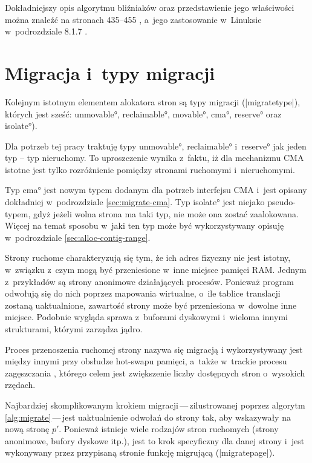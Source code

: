 Dokładniejszy opis algorytmu bliźniaków oraz przedstawienie jego
właściwości można znaleźć na stronach 435--455
\autocite{bib:taocp-fa}, a~jego zastosowanie w~Linuksie w~podrozdziale
8.1.7 \autocite{bib:utlk}.


\section{Migracja i~typy migracji}\label{sec:migratetype}

Kolejnym istotnym elementem alokatora stron są typy migracji
(\code|migratetype|), których jest sześć: \ang*{unmovable},
\ang*{reclaimable}, \ang*{movable}, \ang*{cma}, \ang*{reserve} oraz
\ang*{isolate}).

Dla potrzeb tej pracy traktuję typy \ang*{unmovable},
\ang*{reclaimable} i~\ang*{reserve} jak jeden typ -- typ nieruchomy.
To uproszczenie wynika z~faktu, iż dla mechanizmu CMA istotne jest
tylko rozróżnienie pomiędzy stronami ruchomymi i~nieruchomymi.

Typ \ang*{cma} jest nowym typem dodanym dla potrzeb interfejsu CMA
i~jest opisany dokładniej w~podrozdziale \ref{sec:migrate-cma}.  Typ
\ang*{isolate} jest niejako pseudo-typem, gdyż jeżeli wolna strona ma
taki typ, nie może ona zostać zaalokowana.  Więcej na temat sposobu
w~jaki ten typ może być wykorzystywany opisuję w~podrozdziale
\ref{sec:alloc-contig-range}.

Strony ruchome charakteryzują się tym, że ich adres fizyczny nie jest
istotny, w~związku z~czym mogą być przeniesione w~inne miejsce pamięci
RAM.  Jednym z~przykładów są strony anonimowe działających procesów.
Ponieważ program odwołują się do nich poprzez mapowania wirtualne,
o~ile tablice translacji zostaną uaktualnione, zawartość strony może
być przeniesiona w~dowolne inne miejsce.  Podobnie wygląda sprawa
z~buforami dyskowymi i~wieloma innymi strukturami, którymi zarządza
jądro.

Proces przenoszenia ruchomej strony nazywa się migracją
i wykorzystywany jest między innymi przy obsłudze hot-swapu pamięci,
a~także w~trackie procesu zagęszczania \autocite{bib:compaction,
  bib:supporting-large-contig-regions}, którego celem jest zwiększenie
liczby dostępnych stron o~wysokich rzędach.

Najbardziej skomplikowanym krokiem migracji\,---\,zilustrowanej
poprzez algorytm \ref{alg:migrate}\,---\,jest uaktualnienie odwołań do
strony tak, aby wskazywały na nową stronę $p'$.  Ponieważ istnieje
wiele rodzajów stron ruchomych (strony anonimowe, bufory dyskowe
itp.), jest to krok specyficzny dla danej strony i~jest wykonywany
przez przypisaną stronie funkcję migrującą (\code|migratepage|).

